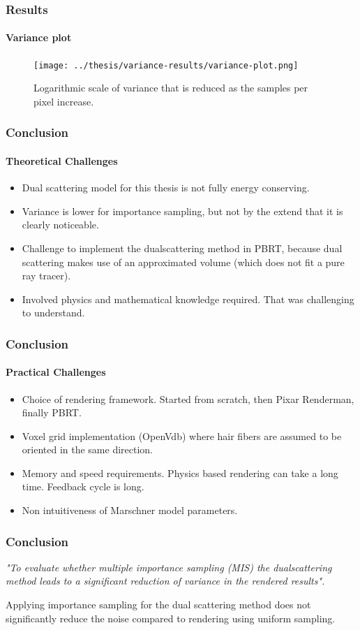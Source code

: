 \documentclass{beamer}
\begin{document}
\begin{frame}
    \frametitle{Results}
    \framesubtitle{Variance plot}
    
    \begin{figure}
    \centering
    \texttt{[image: ../thesis/variance-results/variance-plot.png]} 
    \caption{Logarithmic scale of variance that is reduced as the samples per pixel increase.}
    \end{figure}
  \end{frame}
  
  
  \begin{frame}
    \frametitle{Conclusion}
    \framesubtitle{Theoretical Challenges}
	
	\begin{itemize}
	\item Dual scattering model for this thesis is not fully energy conserving.
	\item Variance is lower for importance sampling, but not by the extend that it is clearly noticeable.
	\item Challenge to implement the dualscattering method in PBRT, because dual scattering makes use of an approximated volume (which does not fit a pure ray tracer).
	\item Involved physics and mathematical knowledge required. That was challenging to understand.
	\end{itemize}
  \end{frame}
  
  \begin{frame}
    \frametitle{Conclusion}
    \framesubtitle{Practical Challenges}
	
	\begin{itemize}
	\item Choice of rendering framework. Started from scratch, then Pixar Renderman, finally PBRT.
	\item Voxel grid implementation (OpenVdb) where hair fibers are assumed to be oriented in the same direction.
	\item Memory and speed requirements. Physics based rendering can take a long time. Feedback cycle is long.
	\item Non intuitiveness of Marschner model parameters.
	\end{itemize}
  \end{frame}
  
  \begin{frame}
  \frametitle{Conclusion}
  
  \begin{center}
	\textit{"To evaluate whether multiple importance sampling (MIS) the dualscattering method leads to a significant reduction of variance in the rendered results".}
	\end{center}
	
  
  Applying importance sampling for the dual scattering method does not significantly reduce the noise compared to rendering using uniform sampling.
  \end{frame}
  
\end{document}
